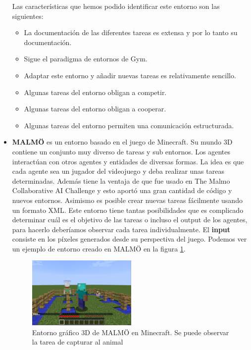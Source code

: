\begin{itemize}
	      Las características que hemos podido identificar este entorno son las siguientes:
	      \begin{itemize}
		      \item La documentación de las diferentes tareas es extensa y por lo tanto su documentación.
		      \item Sigue el paradigma de entornos de Gym.
		      \item Adaptar este entorno y añadir nuevas tareas es relativamente sencillo.
		      \item Algunas tareas del entorno obligan a competir.
		      \item Algunas tareas del entorno obligan a cooperar.
		      \item Algunas tareas del entorno permiten una comunicación estructurada.
	      \end{itemize}

	\item \textbf{MALMÖ} \cite {malmo} es un entorno basado en el juego de Minecraft. Su mundo 3D contiene un conjunto muy diverso de tareas y sub entornos. Los agentes interactúan con otros agentes y entidades de diversas formas. La idea es que cada agente sea un jugador del videojuego y deba realizar unas tareas determinadas. Además tiene la ventaja de que fue usado en The Malmo Collaborative AI Challenge y esto aportó una gran cantidad de código y nuevos entornos. Asimismo es posible crear nuevas tareas fácilmente usando un formato XML. Este entorno tiene tantas posibilidades que es complicado determinar cuál es el objetivo de las tareas o incluso el output de los agentes, para hacerlo deberíamos observar cada tarea individualmente. El \textbf{input} consiste en los píxeles generados desde su perspectiva del juego. Podemos ver un ejemplo de entorno creado en MALMÖ en la figura \ref {fig:malmo}.
	      \begin{figure}[h]
		      \centering
		      \includegraphics[width=0.5\textwidth]{img/mobchase.png}
		      \caption{Entorno gráfico 3D de MALMÖ en Minecraft. Se puede observar la tarea de capturar al animal \cite {malmo}}
		      \label{fig:malmo}
	      \end{figure}


\end{itemize}

